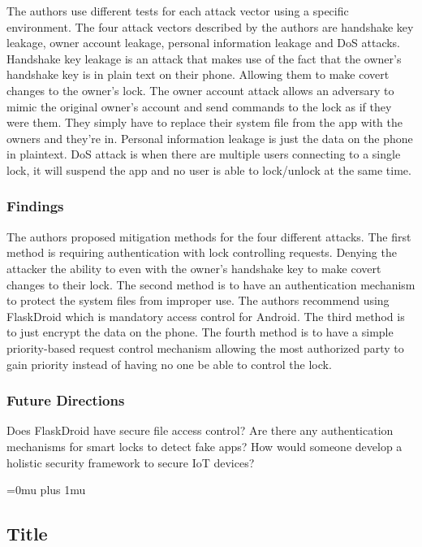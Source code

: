\noindent
The authors use different tests for each attack vector using a specific environment. The four attack vectors described by the authors are handshake key leakage, owner account leakage, personal information leakage and DoS attacks. Handshake key leakage is an attack that makes use of the fact that the owner’s handshake key is in plain text on their phone. Allowing them to make covert changes to the owner’s lock. The owner account attack allows an adversary to mimic the original owner’s account and send commands to the lock as if they were them. They simply have to replace their system file from the app with the owners and they’re in. Personal information leakage is just the data on the phone in plaintext. DoS attack is when there are multiple users connecting to a single lock, it will suspend the app and no user is able to lock/unlock at the same time.



\subsubsection{Findings}

\noindent
The authors proposed mitigation methods for the four different attacks. The first method is requiring authentication with lock controlling requests. Denying the attacker the ability to even with the owner’s handshake key to make covert changes to their lock. The second method is to have an authentication mechanism to protect the system files from improper use. The authors recommend using FlaskDroid which is mandatory access control for Android. The third method is to just encrypt the data on the phone. The fourth method is to have a simple priority-based request control mechanism allowing the most authorized party to gain priority instead of having no one be able to control the lock.

\subsubsection{Future Directions}

\noindent
Does FlaskDroid have secure file access control? Are there any authentication mechanisms for smart locks to detect fake apps? How would someone develop a holistic security framework to secure IoT devices?

\Urlmuskip=0mu plus 1mu\relax


\noindent
\subsection{Title}


